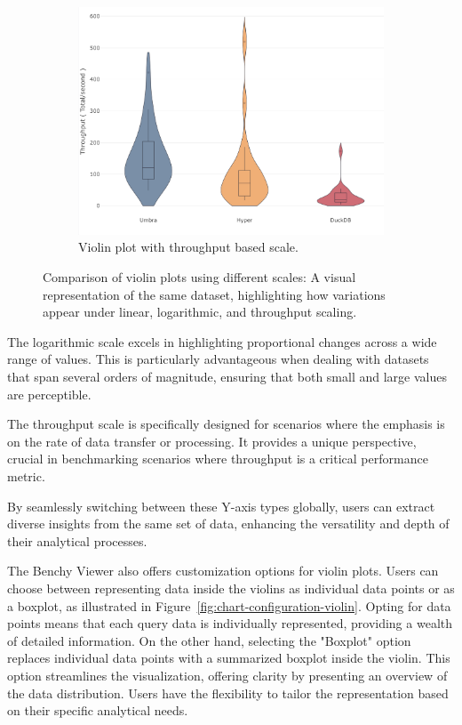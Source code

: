 \begin{figure}[h]
  \begin{subfigure}[b]{0.3\linewidth}
    \includegraphics[width=\linewidth]{figures/scale-throughput.png}
    \caption{Violin plot with throughput based scale.}
      \label{fig:scale-throughput}
  \end{subfigure}
  \caption{Comparison of violin plots using different scales: A visual representation of the same dataset, highlighting how variations appear under linear, logarithmic, and throughput scaling.}
  \label{fig:scale-comparison.}
\end{figure}

The logarithmic scale excels in highlighting proportional changes across a wide range of values. This is particularly advantageous when dealing with datasets that span several orders of magnitude, ensuring that both small and large values are perceptible.

The throughput scale is specifically designed for scenarios where the emphasis is on the rate of data transfer or processing. It provides a unique perspective, crucial in benchmarking scenarios where throughput is a critical performance metric.

By seamlessly switching between these Y-axis types globally, users can extract diverse insights from the same set of data, enhancing the versatility and depth of their analytical processes.


The Benchy Viewer also offers customization options for violin plots. Users can choose between representing data inside the violins as individual data points or as a boxplot, as illustrated in Figure~\ref{fig:chart-configuration-violin}. Opting for data points means that each query data is individually represented, providing a wealth of detailed information. On the other hand, selecting the "Boxplot" option replaces individual data points with a summarized boxplot inside the violin. This option streamlines the visualization, offering clarity by presenting an overview of the data distribution. Users have the flexibility to tailor the representation based on their specific analytical needs.

